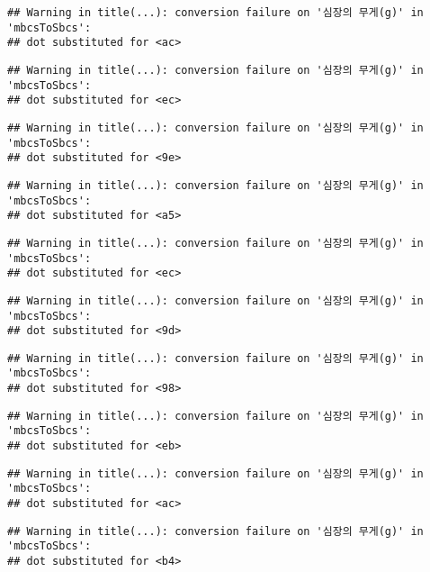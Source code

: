 \documentclass[
]{article}
\begin{document}
\begin{verbatim}
## Warning in title(...): conversion failure on '심장의 무게(g)' in 'mbcsToSbcs':
## dot substituted for <ac>
\end{verbatim}

\begin{verbatim}
## Warning in title(...): conversion failure on '심장의 무게(g)' in 'mbcsToSbcs':
## dot substituted for <ec>
\end{verbatim}

\begin{verbatim}
## Warning in title(...): conversion failure on '심장의 무게(g)' in 'mbcsToSbcs':
## dot substituted for <9e>
\end{verbatim}

\begin{verbatim}
## Warning in title(...): conversion failure on '심장의 무게(g)' in 'mbcsToSbcs':
## dot substituted for <a5>
\end{verbatim}

\begin{verbatim}
## Warning in title(...): conversion failure on '심장의 무게(g)' in 'mbcsToSbcs':
## dot substituted for <ec>
\end{verbatim}

\begin{verbatim}
## Warning in title(...): conversion failure on '심장의 무게(g)' in 'mbcsToSbcs':
## dot substituted for <9d>
\end{verbatim}

\begin{verbatim}
## Warning in title(...): conversion failure on '심장의 무게(g)' in 'mbcsToSbcs':
## dot substituted for <98>
\end{verbatim}

\begin{verbatim}
## Warning in title(...): conversion failure on '심장의 무게(g)' in 'mbcsToSbcs':
## dot substituted for <eb>
\end{verbatim}

\begin{verbatim}
## Warning in title(...): conversion failure on '심장의 무게(g)' in 'mbcsToSbcs':
## dot substituted for <ac>
\end{verbatim}

\begin{verbatim}
## Warning in title(...): conversion failure on '심장의 무게(g)' in 'mbcsToSbcs':
## dot substituted for <b4>
\end{verbatim}
\end{document}

